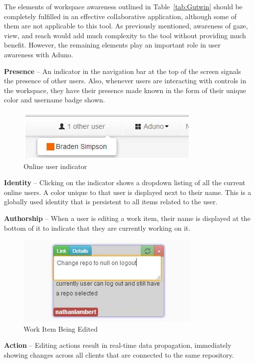 \documentclass[conference]{IEEEtran}
\begin{document}
The elements of workspace awareness outlined in Table~\ref{tab:Gutwin} should be completely fulfilled in an effective collaborative application, although some of them are not applicable to this tool. As previously mentioned, awareness of gaze, view, and reach would add much complexity to the tool without providing much benefit. However, the remaining elements play an important role in user awareness with Aduno.
  
{\bf Presence} – An indicator in the navigation bar at the top of the screen signals the presence of other users.  Also, whenever users are interacting with controls in the workspace, they have their presence made known in the form of their unique color and username badge shown.

\begin{figure}[htb]
\centering
\includegraphics[scale=0.5]{aduno01}
\caption{Online user indicator}
\label{fig:otherusers}
\end{figure}

{\bf Identity} – Clicking on the indicator shows a dropdown listing of all the current online users. A color unique to that user is displayed next to their name.  This is a globally used identity that is persistent to all items related to the user. 

{\bf Authorship} – When a user is editing a work item, their name is displayed at the bottom of it to indicate that they are currently working on it.

\begin{figure}[htb]
\centering
\includegraphics[scale=0.5]{aduno02}
\caption{Work Item Being Edited}
\label{fig:workitem}
\end{figure}

{\bf Action} – Editing actions result in real-time data propagation, immediately showing changes across all clients that are connected to the same repository.  
\end{document}
